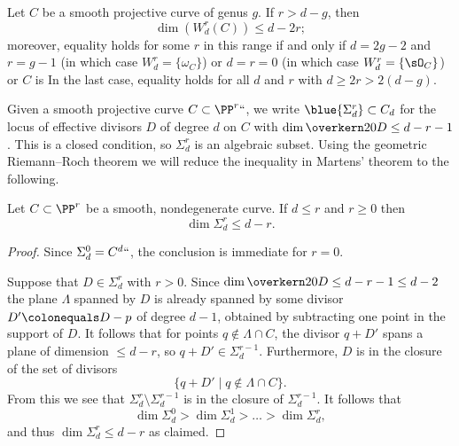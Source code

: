 \begin{theorem}\cite{Martens}\label{Martens' inequality}
Let $C$ be a smooth projective curve of genus $g$. If $r > d-g$, then 
$$
\dim(W^r_d(C)) \leq d-2r;
$$
moreover, equality holds for some $r$ in this range if and only if $d=2g-2$ and $r= g-1$ (in which case $W^r_d = \{\omega_C\}$) or
$d=r=0$ (in which case $W^r_d = \{\sO_C\}$) or $C$ is 
%
In the last case, equality holds for all $d$ and $r$ with $d\geq 2r > 2(d-g)$.
\unif
\end{theorem}

Given 
a smooth projective curve $C \subset \PP^r` `$, we write $
\blue{\Sigma^r_d}
\subset C_d$ 
%
for the locus of effective divisors $D$ of degree $d$ on
$C$ with $\dim \overkern20 D \leq d-r-1$. This is a closed condition, so 
$\Sigma^r_d$ is an algebraic subset. Using the 
geometric Riemann--Roch theorem
we will reduce the inequality in Martens' theorem to the following.

\begin{lemma}\label{elementary secant plane lemma}
Let 
%
%
$C \subset \PP^r$ be a smooth, nondegenerate curve. If $d \leq r$ and $r \geq 0$ then
$$
\dim \Sigma^r_d \leq d-r.
$$
\end{lemma}

\begin{proof}
Since $\Sigma^0_d = C^d` `$, the conclusion is immediate for $r=0$.

Suppose that  $D\in \Sigma^r_d$ with $r>0$. Since $\dim \overkern20 D\leq d-r-1\leq d-2$ the plane
$\Lambda$ spanned by $D$ is already spanned by some divisor  $D' \colonequals D -p$ of degree $d-1$, 
obtained by subtracting one point  in the support of $D$.
It follows that for points $q\notin \Lambda \cap C$, the divisor $q+D'$ spans a plane of dimension $\leq d-r$, 
so $q+D'\in \Sigma^{r-1}_{d}$.
Furthermore,  $D$ is in the closure of the set of divisors
$$
\{q+D' \mid q\notin \Lambda \cap C \}.
$$
From this we see that $\Sigma^r_d\setminus \Sigma^{r-1}_d$ is in the closure of  $\Sigma^{r-1}_d$. It follows that 
$$
\dim \Sigma^0_d >  \dim \Sigma^1_d > \dots > \dim \Sigma^r_d,
$$ 
and thus $\dim \Sigma^r_d \leq d-r$ as claimed.
\end{proof}

